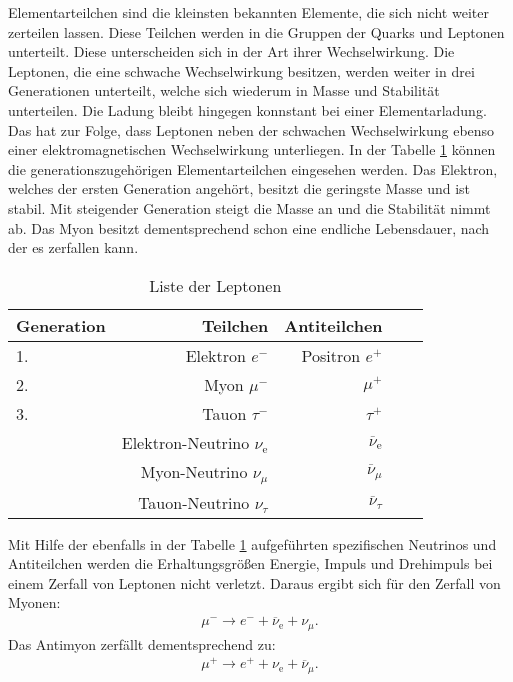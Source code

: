 Elementarteilchen sind die kleinsten bekannten Elemente, die sich nicht weiter zerteilen lassen.
Diese Teilchen werden in die Gruppen der Quarks und Leptonen unterteilt.
Diese unterscheiden sich in der Art ihrer Wechselwirkung.
Die Leptonen, die eine schwache Wechselwirkung besitzen, werden weiter in drei Generationen unterteilt, welche sich wiederum in Masse und Stabilität unterteilen.
Die Ladung bleibt hingegen konnstant bei einer Elementarladung.
Das hat zur Folge, dass Leptonen neben der schwachen Wechselwirkung ebenso einer elektromagnetischen Wechselwirkung unterliegen.
In der Tabelle \ref{tab:gen} können die generationszugehörigen Elementarteilchen eingesehen werden.
Das Elektron, welches der ersten Generation angehört, besitzt die geringste Masse und ist stabil.
Mit steigender Generation steigt die Masse an und die Stabilität nimmt ab.
Das Myon besitzt dementsprechend schon eine endliche Lebensdauer, nach der es zerfallen kann.
\begin{table}[h!]
  \centering
  \caption{Liste der Leptonen \cite{1}}
  \label{tab:gen}
  \begin{tabular}{l r r l l}
    \toprule
      Generation & Teilchen & Antiteilchen  \\
      \midrule
      1.& Elektron $e^{-}$                   &   Positron $e^{+}$    \\
      2.& Myon   $\mu^{-}$                   &          $\mu^{+}$    \\
      3.& Tauon $\tau^{-}$                   &         $\tau^{+}$    \\
      \midrule
        & Elektron-Neutrino $\nu_{\text{e}}$ & $\overline{\nu}_{\text{e}}$\\
        & Myon-Neutrino     $\nu_{\mu}$      & $\overline{\nu}_{\mu}$     \\
        & Tauon-Neutrino    $\nu_{\tau}$     & $\overline{\nu}_{\tau}$    \\
    \bottomrule
  \end{tabular}
\end{table}
\FloatBarrier

Mit Hilfe der ebenfalls in der Tabelle \ref{tab:gen} aufgeführten spezifischen Neutrinos und Antiteilchen
werden die Erhaltungsgrößen Energie, Impuls und Drehimpuls bei einem Zerfall von Leptonen nicht verletzt.
Daraus ergibt sich für den Zerfall von Myonen:
\begin{align}
  \mu^{-}\rightarrow e^-+\overline{\nu}_\text{e}+\nu_{\mu}.
  \label{eqn:mu-}
\end{align}
Das Antimyon zerfällt dementsprechend zu:
\begin{align}
  \mu^{+}\rightarrow e^++\nu_\text{e}+\overline{\nu}_{\mu}.
  \label{eqn:mu+}
\end{align}

